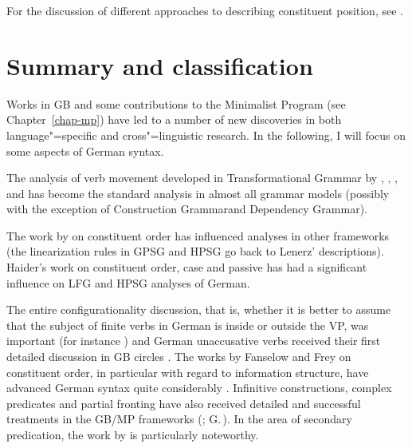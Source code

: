 For the discussion of different approaches to describing constituent position, see 
.




\section{Summary and classification}
\label{sec-summary-gb}

Works in GB and some contributions to the Minimalist Program (see Chapter~\ref{chap-mp}) have led to a number of new discoveries in both language"=specific and cross"=linguistic research. In
the following, I will focus on some aspects of German syntax.

The analysis of verb movement developed in Transformational Grammar by \citet*[]{Bierwisch63a}, \citet{Reis74a},
\citet{Koster75a}, \citet[Chapter~1]{Thiersch78a} and \citet{denBesten83a} has become the standard analysis in almost
all grammar models (possibly with the exception of Construction Grammar\indexcxg and Dependency Grammar\indexdg).

The work by \citet{Lenerz77} on constituent order has influenced analyses in other frameworks
(the linearization rules in GPSG and HPSG go back to Lenerz' descriptions). Hai\-der's work on constituent order,
case and passive \citeyearpar{Haider84b,Haider85,Haider85b,Haider86,Haider90a,Haider93a} has had a significant influence on LFG
and HPSG analyses of German.

The entire configurationality discussion, that is, whether it is better to assume that the 
subject of finite verbs in German is inside or outside the VP, was important
(for instance \citealp*{Haider82,Grewendorf83a,Kratzer84a,Kratzer96a,Webelhuth85a,%
Sternefeld85b,%
Scherpenisse86a,%
Fanselow87a,Grewendorf88a,Duerscheid89a,Webelhuth90,%
Oppenrieder91a,%
Wilder91a,Haider93a,Grewendorf93,%
Frey93a,%
Lenerz94a,%
Meinunger2000a%
}) and German unaccusative verbs received their first detailed discussion in GB circles 
\citep{Grewendorf89a,Fanselow92}. The works by Fanselow and Frey on constituent order, in 
particular with regard to information structure, have advanced German syntax quite considerably
\citep{Fanselow88,Fanselow90,Fanselow93a,Fanselow2000a,Fanselow2001a,Fanselow2003d,Fanselow2003a,Fanselow2004a,Frey2000a-u,Frey2001a,Frey2004a,Frey2005a}.
Infinitive constructions, complex predicates and partial fronting have also received detailed and successful treatments
in the GB/MP frameworks
(\citealp{Bierwisch63a,Evers75a,Haider82,Haider86c,Haider90b,Haider91,Haider93a,Grewendorf83a,Grewendorf87a,Grewendorf88a,denBesten85b,Sternefeld85b,Fanselow87a,Fanselow2002a,SS88a,BK89a}; G.\,\citealp{GMueller96a,GMueller98a,VS98a}).
In the area of secondary predication, the work by \citet{Winkler97a} is particularly noteworthy.


